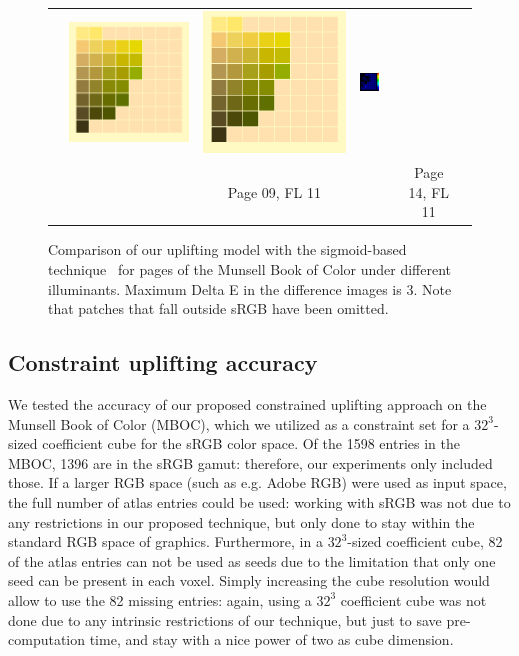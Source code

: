 \begin{figure}[ht!]
{\begin{tabular}{ccccccc}
			&\quad
			\includegraphics[width=.15\linewidth]{img/results_uplift_page14_originalFL11.png}
			&
			\includegraphics[width=.15\linewidth]{img/results_uplift_page14_ourFL11.png}
			&
			\includegraphics[width=.15\linewidth,height=5.25em]{img/results_uplift_page14_diff_ourFL11.png}\\
			& & Page 09, FL 11 & & & Page 14, FL 11 & \\
		\end{tabular}
	}
	\caption{Comparison of our uplifting model with the sigmoid-based technique~\cite{upsamplingJakobHanika} for pages of the Munsell Book of Color under different illuminants. Maximum Delta E in the difference images is 3. Note that patches that fall outside sRGB have been omitted.}
	\label{fig:results_uplift_munsell}
\end{figure}


\subsection{Constraint uplifting accuracy}

We tested the accuracy of our proposed constrained uplifting approach on the Munsell Book of Color (MBOC), which we utilized as a constraint set for a $32^3$-sized coefficient cube for the sRGB color space. Of the 1598 entries in the MBOC, 1396 are in the sRGB gamut: therefore, our experiments only included those. If a larger RGB space (such as e.g. Adobe RGB) were used as input space, the full number of atlas entries could be used: working with sRGB was not due to any restrictions in our proposed technique, but only done to stay within the standard RGB space of graphics. Furthermore, in a $32^3$-sized coefficient cube, 82 of the atlas entries can not be used as seeds due to the limitation that only one seed can be present in each voxel. Simply increasing the cube resolution would allow to use the 82 missing entries: again, using a $32^3$ coefficient cube was not done due to any intrinsic restrictions of our technique, but just to save pre-computation time, and stay with a nice power of two as cube dimension.

